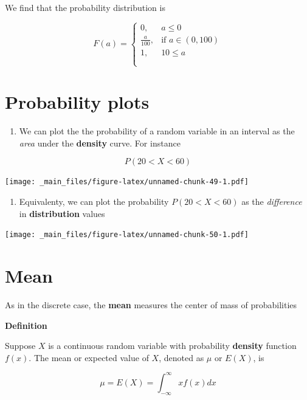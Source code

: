 \documentclass[
]{book}
\providecommand{\tightlist}{%
  \setlength{\itemsep}{0pt}\setlength{\parskip}{0pt}}
\begin{document}
We find that the probability distribution is

\[
    F(a)= 
\begin{cases}
    0,& a \leq 0 \\
    \frac{a}{100},& \text{if } a\in (0,100)\\
    1, & 10 \leq a \\
    \\
\end{cases}
\]

\newpage

\hypertarget{probability-plots}{%
\section{Probability plots}\label{probability-plots}}

\begin{enumerate}
\def\labelenumi{\arabic{enumi})}
\tightlist
\item
  We can plot the the probability of a random variable in an interval as the \emph{area} under the \textbf{density} curve. For instance
\end{enumerate}

\[P(20<X<60)\]

\texttt{[image: \_main\_files/figure-latex/unnamed-chunk-49-1.pdf]}

\begin{enumerate}
\def\labelenumi{\arabic{enumi})}
\setcounter{enumi}{1}
\tightlist
\item
  Equivalenty, we can plot the probability \(P(20<X<60)\) as the \emph{difference} in \textbf{distribution} values
\end{enumerate}

\texttt{[image: \_main\_files/figure-latex/unnamed-chunk-50-1.pdf]}

\hypertarget{mean}{%
\section{Mean}\label{mean}}

As in the discrete case, the \textbf{mean} measures the center of mass of probabilities

\textbf{Definition}

Suppose \(X\) is a continuous random variable with probability \textbf{density} function \(f(x)\). The mean or expected value of \(X\), denoted as \(\mu\) or \(E(X)\), is

\[\mu=E(X)=\int_{-\infty}^\infty x f(x) dx\]
\end{document}
